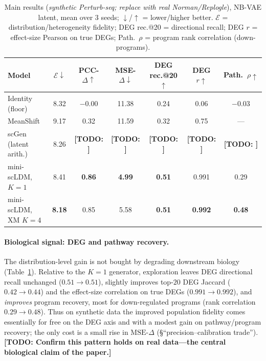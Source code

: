\documentclass{article}
\newcommand{\TODO}[1]{{\color{red}\textbf{[TODO: #1]}}}
\newcommand{\Ed}{\mathcal{E}} %
\begin{document}
\begin{table}[t]
\centering
\caption{Main results (\emph{synthetic Perturb-seq; replace with real
Norman/Replogle}), NB-VAE latent, mean over 3 seeds; $\downarrow$/$\uparrow$ =
lower/higher better. $\Ed$ = distribution/heterogeneity fidelity; DEG rec.@20 =
directional recall; DEG $r$ = effect-size Pearson on true DEGs; Path.\ $\rho$ =
program rank correlation (down-programs).}
\label{tab:main}
\small
\begin{tabular}{lcccccc}
\toprule
Model & $\Ed\downarrow$ & PCC-$\Delta\uparrow$ & MSE-$\Delta\downarrow$ &
DEG rec.@20$\uparrow$ & DEG $r\uparrow$ & Path.\ $\rho\uparrow$ \\
\midrule
Identity (floor)      & 8.32 & $-0.00$ & 11.38 & 0.24 & 0.06 & $-0.03$ \\
MeanShift             & 9.17 & 0.32 & 11.59 & 0.32 & 0.75 & --- \\
scGen (latent arith.) & 8.26 & \TODO{} & \TODO{} & \TODO{} & \TODO{} & \TODO{} \\
mini-scLDM, $K{=}1$   & 8.41 & \textbf{0.86} & \textbf{4.99} & \textbf{0.51} & 0.991 & 0.29 \\
mini-scLDM, XM $K{=}4$& \textbf{8.18} & 0.85 & 5.58 & \textbf{0.51} & \textbf{0.992} & \textbf{0.48} \\
\bottomrule
\end{tabular}
\end{table}

\paragraph{Biological signal: DEG and pathway recovery.}
The distribution-level gain is not bought by degrading downstream biology
(Table~\ref{tab:main}). Relative to the $K{=}1$ generator, exploration leaves DEG
directional recall unchanged ($0.51\!\to\!0.51$), slightly improves top-$20$
DEG Jaccard ($0.42\!\to\!0.44$) and the effect-size correlation on true DEGs
($0.991\!\to\!0.992$), and \emph{improves} program recovery, most for
down-regulated programs (rank correlation $0.29\!\to\!0.48$). Thus on synthetic
data the improved population fidelity comes essentially for free on the DEG axis
and with a modest gain on pathway/program recovery; the only cost is a small
rise in $\text{MSE-}\Delta$ (\S``precision--calibration trade''). \TODO{Confirm
this pattern holds on real data---the central biological claim of the paper.}
\end{document}
